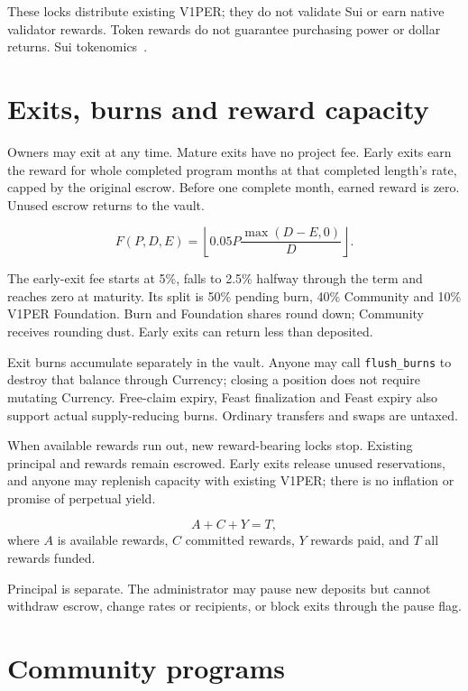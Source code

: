\documentclass[11pt]{article}
\newcommand{\VOnePER}{\texorpdfstring{V\textcolor{brandone}{1}PER}{V1PER}}
\begin{document}
These locks distribute existing \VOnePER{}; they do not validate Sui or earn native validator rewards. Token rewards do not guarantee purchasing power or dollar returns. Sui tokenomics~\cite{ref6}.

\section{Exits, burns and reward capacity}

Owners may exit at any time. Mature exits have no project fee. Early exits earn the reward for whole completed program months at that completed length's rate, capped by the original escrow. Before one complete month, earned reward is zero. Unused escrow returns to the vault.

\begin{equation}
F(P,D,E)=\left\lfloor 0.05P\frac{\max(D-E,0)}{D}\right\rfloor.
\end{equation}

The early-exit fee starts at 5\%, falls to 2.5\% halfway through the term and reaches zero at maturity. Its split is 50\% pending burn, 40\% Community and 10\% \VOnePER{} Foundation. Burn and Foundation shares round down; Community receives rounding dust. Early exits can return less than deposited.

Exit burns accumulate separately in the vault. Anyone may call \texttt{flush\_burns} to destroy that balance through Currency; closing a position does not require mutating Currency. Free-claim expiry, Feast finalization and Feast expiry also support actual supply-reducing burns. Ordinary transfers and swaps are untaxed.

When available rewards run out, new reward-bearing locks stop. Existing principal and rewards remain escrowed. Early exits release unused reservations, and anyone may replenish capacity with existing \VOnePER{}; there is no inflation or promise of perpetual yield.

\begin{equation}
A+C+Y=T,
\end{equation}
\noindent where $A$ is available rewards, $C$ committed rewards, $Y$ rewards paid, and $T$ all rewards funded.

Principal is separate. The administrator may pause new deposits but cannot withdraw escrow, change rates or recipients, or block exits through the pause flag.

\section{Community programs}
\end{document}
